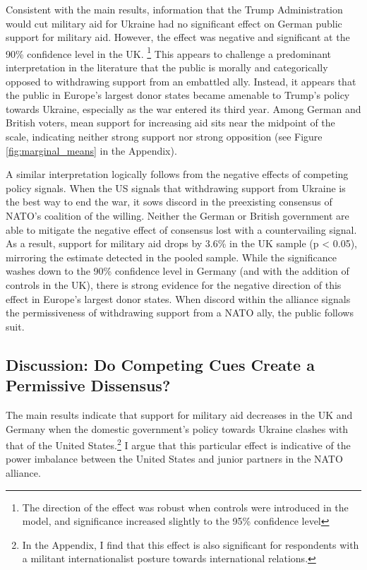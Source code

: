 Consistent with the main results, information that the Trump Administration would cut military aid for Ukraine had no significant effect on German public support for military aid. However, the effect was negative and significant at the 90\% confidence level in the UK. \footnote{The direction of the effect was robust when controls were introduced in the model, and significance increased slightly to the 95\% confidence level} This appears to challenge a predominant interpretation in the literature that the public is morally and categorically opposed to withdrawing support from an embattled ally. Instead, it appears that the public in Europe's largest donor states became amenable to Trump's policy towards Ukraine, especially as the war entered its third year. Among German and British voters, mean support for increasing aid sits near the midpoint of the scale, indicating neither strong support nor strong opposition (see Figure \ref{fig:marginal_means} in the Appendix). 

A similar interpretation logically follows from the negative effects of competing policy signals. When the US signals that withdrawing support from Ukraine is the best way to end the war, it sows discord in the preexisting consensus of NATO's coalition of the willing. Neither the German or British government are able to mitigate the negative effect of consensus lost with a countervailing signal. As a result, support for military aid drops by 3.6\% in the UK sample (p < 0.05), mirroring the estimate detected in the pooled sample. While the significance washes down to the 90\% confidence level in Germany (and with the addition of controls in the UK), there is strong evidence for the negative direction of this effect in Europe's largest donor states. When discord within the alliance signals the permissiveness of withdrawing support from a NATO ally, the public follows suit. 

\subsection{Discussion: Do Competing Cues Create a Permissive Dissensus?}
The main results indicate that support for military aid decreases in the UK and Germany when the domestic government's policy towards Ukraine clashes with that of the United States.\footnote{In the Appendix, I find that this effect is also significant for respondents with a militant internationalist posture towards international relations.} I argue that this particular effect is indicative of the power imbalance between the United States and junior partners in the NATO alliance. 

